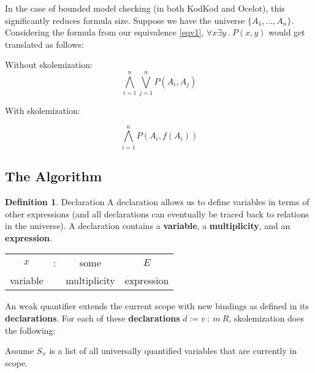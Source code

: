 \documentclass{article}
\theoremstyle{definition}
\newtheorem{definition}{Definition}[section]
\begin{document}
    In the case of bounded model checking (in both KodKod and Ocelot), this significantly reduces formula size. Suppose we have the universe $\{A_1, \dots, A_n\}$. Considering the formula from our equivalence \ref{eqv1}, $\forall x \exists y~.~P(x,y)$ would get translated as follows:

    Without skolemization:
    \begin{equation} \label{woskolem}
        \bigwedge_{i=1}^n\bigvee_{j=1}^n P(A_i, A_j)
    \end{equation}

    With skolemization:

    \begin{equation} \label{woskolem}
        \bigwedge_{i=1}^nP(A_i, f(A_i))
    \end{equation}

    \subsection{The Algorithm}

    \theoremstyle{definition}
    \begin{definition}{Declaration}
        A declaration allows us to define variables in terms of other expressions (and all declarations can eventually be traced back to relations in the universe). A declaration contains a \textbf{variable}, a \textbf{multiplicity}, and an \textbf{expression}.

        \begin{center}
            \begin{tabular}{c c c c}
                $x$ & : & some & $E$ \\
                variable & & multiplicity & expression
            \end{tabular}
        \end{center}
    \end{definition}

    An weak quantifier extends the current scope with new bindings as defined in its \textbf{declarations}. For each of these \textbf{declarations} $d := v~:~m~R$, skolemization does the following:

    Assume $S_\forall$ is a list of all universally quantified variables that are currently in scope.
\end{document}

